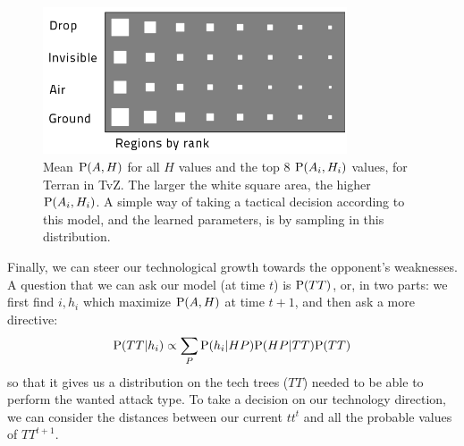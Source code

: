 \begin{figure}[!h]
\centerline{\includegraphics[width=9cm]{images/WhereHow_T_TvZ_light.png}}
\caption{Mean $\mathrm{P}(A,H)$ for all $H$ values and the top 8 $\mathrm{P}(A_i,H_i)$ values, for Terran in TvZ. The larger the white square area, the higher $\mathrm{P}(A_i,H_i)$. A simple way of taking a tactical decision according to this model, and the learned parameters, is by sampling in this distribution.}
\label{fig:WhereHow}
\end{figure}

Finally, we can steer our technological growth towards the opponent's weaknesses. A question that we can ask our model (at time $t$) is $\mathrm{P}(TT)$, or, in two parts: we first find $i,h_i$ which maximize $\mathrm{P}(A,H)$ at time $t+1$, and then ask a more directive:
$$\mathrm{P}(TT|h_i) \propto \sum_{P} \mathrm{P}(h_i|HP)\mathrm{P}(HP|TT)\mathrm{P}(TT)$$
so that it gives us a distribution on the tech trees ($TT$) needed to be able to perform the wanted attack type. To take a decision on our technology direction, we can consider the distances between our current $tt^t$ and all the probable values of $TT^{t+1}$.

